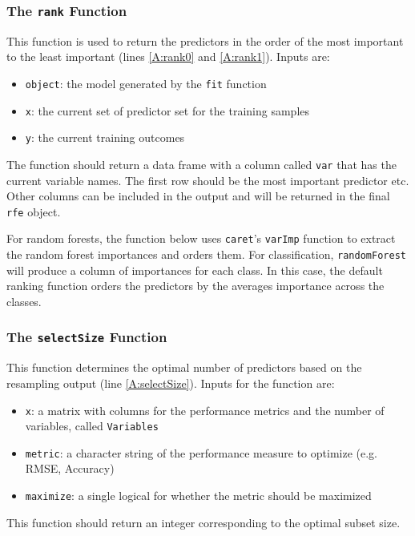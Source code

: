 \documentclass[12pt]{article}
\begin{document}
\subsubsection{The \texttt{rank} Function}

This function is used to return the predictors in the order of the most important to the least important (lines \ref{A:rank0} and \ref{A:rank1}). Inputs are:
\begin{itemize}
\item \texttt{object}: the model generated by the \texttt{fit} function
\item \texttt{x}: the current set of predictor set for the training samples
\item \texttt{y}: the current training outcomes
\end{itemize}
The function should return a data frame with a column called \texttt{var} that has the current variable names. The first row should be the most important predictor etc. Other columns can be included in the output and will be returned in the final \texttt{rfe} object.

For random forests, the function below uses \texttt{caret}'s \texttt{varImp} function to extract the random forest importances and orders them. For classification, \texttt{randomForest} will produce a column of importances for each class. In this case, the default ranking function orders the predictors by the averages importance across the classes.
\begin{Schunk}
\end{Schunk}

\subsubsection{The \texttt{selectSize} Function}

This function determines the optimal number of predictors based on the resampling output (line \ref{A:selectSize}). Inputs for the function are:
\begin{itemize}
\item \texttt{x}: a matrix with columns for the performance metrics and the number of variables, called \texttt{Variables}
\item \texttt{metric}: a character string of the performance measure to optimize (e.g. RMSE, Accuracy)
\item \texttt{maximize}: a single logical for whether the metric should be maximized
\end{itemize}
This function should return an integer corresponding to the optimal subset size.
\end{document}
